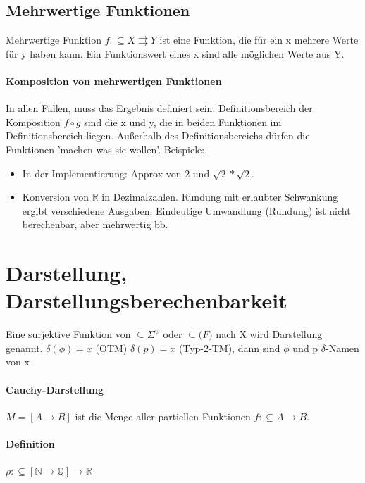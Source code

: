 \documentclass[ngerman]{scrartcl}
\begin{document}
\subsection{Mehrwertige Funktionen}
Mehrwertige Funktion $ f: \subseteq X \rightrightarrows  Y $ ist eine Funktion, die für ein x mehrere Werte für y haben kann. Ein Funktionswert eines x sind alle möglichen Werte aus Y.

\paragraph{Komposition von mehrwertigen Funktionen} In allen Fällen, muss das Ergebnis definiert sein. Definitionsbereich  der Komposition $ f \circ g $ sind die x und y, die in beiden Funktionen im Definitionsbereich liegen. Außerhalb des Definitionsbereichs dürfen die Funktionen 'machen was sie wollen'. Beispiele:
\begin{itemize}
  \item In der Implementierung: Approx von 2 und $ \sqrt{2} * \sqrt{2} $.
  \item Konversion von $ \mathbb{R} $ in Dezimalzahlen. Rundung mit erlaubter Schwankung ergibt verschiedene Ausgaben. Eindeutige Umwandlung (Rundung) ist nicht berechenbar, aber mehrwertig bb.
\end{itemize}


%
%
\section{Darstellung, Darstellungsberechenbarkeit}

Eine surjektive Funktion von $ \subseteq \Sigma^\psi$ oder $ \subseteq \mathbb(F)$ nach X wird Darstellung genannt.
$ \delta(\phi) = x $ (OTM) $\delta(p) = x $ (Typ-2-TM), dann sind $ \phi$ und p $\delta$-Namen von x

\paragraph{Cauchy-Darstellung}
$ M = [A \rightarrow B] $ ist die Menge aller partiellen Funktionen $ f : \subseteq A \rightarrow B $.

\paragraph{Definition} $ \rho : \subseteq[\mathbb{N}\rightarrow\mathbb{Q}] \rightarrow \mathbb{R}$
\end{document}
